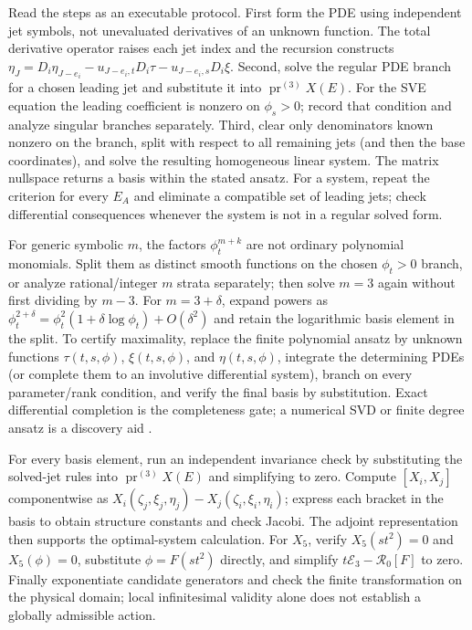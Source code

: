 \documentclass[11pt]{article}
\newcommand{\E}{\mathcal E}
\begin{document}
Read the steps as an executable protocol. First form the PDE using independent
jet symbols, not unevaluated derivatives of an unknown function. The total
derivative operator raises each jet index and the recursion constructs
$\eta_J=D_i\eta_{J-e_i}-u_{J-e_i,t}D_i\tau-u_{J-e_i,s}D_i\xi$.
Second, solve the regular PDE branch for a chosen leading jet and substitute
it into $\operatorname{pr}^{(3)}X(E)$. For the SVE equation the leading
coefficient is nonzero on $\phi_s>0$; record that condition and analyze
singular branches separately. Third, clear only denominators known nonzero on
the branch, split with respect to all remaining jets (and then the base
coordinates), and solve the resulting homogeneous linear system. The matrix
nullspace returns a basis within the stated ansatz. For a system, repeat the
criterion for every $E_A$ and eliminate a compatible set of leading jets;
check differential consequences whenever the system is not in a regular
solved form.

For generic symbolic $m$, the factors $\phi_t^{m+k}$ are not ordinary
polynomial monomials. Split them as distinct smooth functions on the chosen
$\phi_t>0$ branch, or analyze rational/integer $m$ strata separately; then
solve $m=3$ again without first dividing by $m-3$. For
$m=3+\delta$, expand powers as
$\phi_t^{2+\delta}=\phi_t^2(1+\delta\log\phi_t)+O(\delta^2)$ and retain the
logarithmic basis element in the split. To certify maximality, replace the
finite polynomial ansatz by unknown functions $\tau(t,s,\phi)$,
$\xi(t,s,\phi)$, and $\eta(t,s,\phi)$, integrate the determining PDEs (or
complete them to an involutive differential system), branch on every
parameter/rank condition, and verify the final basis by substitution. Exact
differential completion is the completeness gate; a numerical SVD or finite
degree ansatz is a discovery aid \cite{approxalg}.

For every basis element, run an independent invariance check by substituting
the solved-jet rules into $\operatorname{pr}^{(3)}X(E)$ and simplifying to
zero. Compute $[X_i,X_j]$ componentwise as
$X_i(\zeta_j,\xi_j,\eta_j)-X_j(\zeta_i,\xi_i,\eta_i)$; express each bracket
in the basis to obtain structure constants and check Jacobi. The adjoint
representation then supports the optimal-system calculation. For $X_5$,
verify $X_5(st^2)=0$ and $X_5(\phi)=0$, substitute $\phi=F(st^2)$ directly,
and simplify $t\E_3-\mathcal R_0[F]$ to zero. Finally exponentiate candidate
generators and check the finite transformation on the physical domain; local
infinitesimal validity alone does not establish a globally admissible action.
\end{document}
